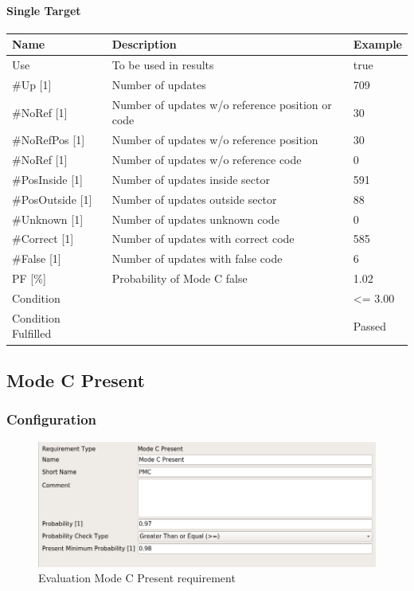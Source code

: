 \paragraph{Single Target}

\begin{center}
 \begin{table}[H]
  \begin{tabularx}{\textwidth}{ | l | X |  l | }
    \hline
    \textbf{Name} & \textbf{Description} & \textbf{Example} \\ \hline
    Use & To be used in results & true \\ \hline
    \#Up [1] & Number of updates & 709 \\ \hline
    \#NoRef [1] & Number of updates w/o reference position or code & 30 \\ \hline
    \#NoRefPos [1] & Number of updates w/o reference position  & 30 \\ \hline
    \#NoRef [1] & Number of updates w/o reference code & 0 \\ \hline
    \#PosInside [1] & Number of updates inside sector & 591 \\ \hline
    \#PosOutside [1] & Number of updates outside sector & 88 \\ \hline
    \#Unknown [1] & Number of updates unknown code & 0 \\ \hline
    \#Correct [1] & Number of updates with correct code & 585 \\ \hline
    \#False [1] & Number of updates with false code & 6 \\ \hline
    PF [\%] & Probability of Mode C false & 1.02 \\ \hline
    Condition &  & <= 3.00 \\ \hline
    Condition Fulfilled &  & Passed \\ \hline
\end{tabularx}
\end{table}
\end{center}

\subsection{Mode C Present}
\label{sec:eval_req_mc_present} 

\subsubsection{Configuration}

\begin{figure}[H]
    \includegraphics[width=14cm,frame]{../screenshots/eval_req_mc_present.png}
  \caption{Evaluation Mode C Present requirement}
\end{figure}

